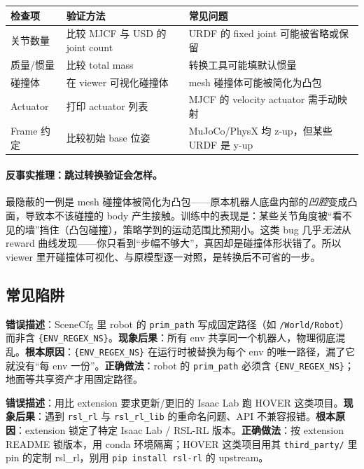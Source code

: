 \begin{center}
\small
\begin{tabular}{@{}lp{4.4cm}p{4.8cm}@{}}
\toprule
检查项 & 验证方法 & 常见问题 \\
\midrule
关节数量 & 比较 MJCF 与 USD 的 joint count & URDF 的 fixed joint 可能被省略或保留 \\
质量/惯量 & 比较 total mass & 转换工具可能填默认惯量 \\
碰撞体 & 在 viewer 可视化碰撞体 & mesh 碰撞体可能被简化为凸包 \\
Actuator & 打印 actuator 列表 & MJCF 的 velocity actuator 需手动映射 \\
Frame 约定 & 比较初始 base 位姿 & MuJoCo/PhysX 均 z-up，但某些 URDF 是 y-up \\
\bottomrule
\end{tabular}
\end{center}

\paragraph{反事实推理：跳过转换验证会怎样。}最隐蔽的一例是 mesh 碰撞体被简化为凸包——原本机器人底盘内部的\emph{凹腔}变成凸面，导致本不该碰撞的 body 产生接触。训练中的表现是：某些关节角度被“看不见的墙”挡住（凸包碰撞），策略学到的运动范围比预期小。这类 bug 几乎\emph{无法}从 reward 曲线发现——你只看到“步幅不够大”，真因却是碰撞体形状错了。所以 viewer 里开碰撞体可视化、与原模型逐一对照，是转换后不可省的一步。

\subsection{常见陷阱}
\label{sec:rlmc-diy-isaac-pitfalls}

\begin{pitfall}
\textbf{错误描述}：SceneCfg 里 robot 的 \verb|prim_path| 写成固定路径（如 \verb|/World/Robot|）而非含 \verb|{ENV_REGEX_NS}|。\textbf{现象后果}：所有 env 共享同一个机器人，物理彻底混乱。\textbf{根本原因}：\verb|{ENV_REGEX_NS}| 在运行时被替换为每个 env 的唯一路径，漏了它就没有“每 env 一份”。\textbf{正确做法}：robot 的 \verb|prim_path| 必须含 \verb|{ENV_REGEX_NS}|；地面等共享资产才用固定路径。
\end{pitfall}

\begin{pitfall}
\textbf{错误描述}：用比 extension 要求更新/更旧的 Isaac Lab 跑 HOVER 这类项目。\textbf{现象后果}：遇到 \verb|rsl_rl| 与 \verb|rsl_rl_lib| 的重命名问题、API 不兼容报错。\textbf{根本原因}：extension 锁定了特定 Isaac Lab / RSL-RL 版本。\textbf{正确做法}：按 extension README 锁版本，用 conda 环境隔离；HOVER 这类项目用其 \verb|third_party/| 里 pin 的定制 rsl\_rl，别用 \verb|pip install rsl-rl| 的 upstream。
\end{pitfall}

